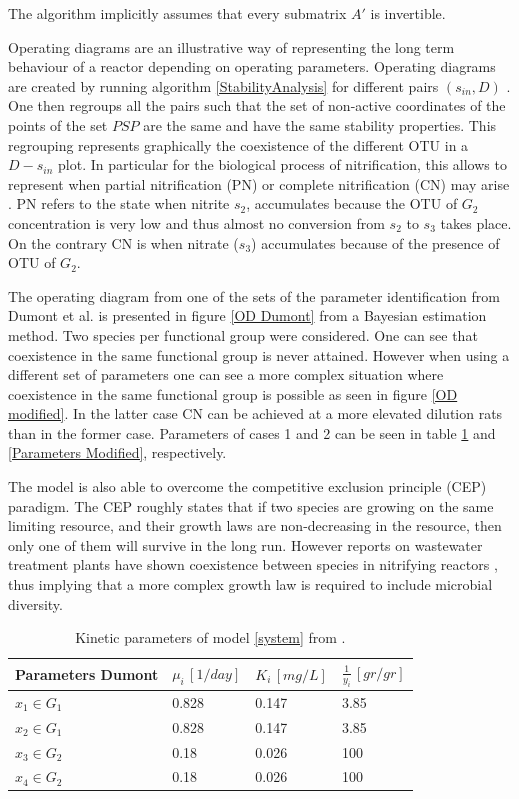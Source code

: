 \documentclass[3p,times]{elsarticle}
\begin{document}
The algorithm implicitly assumes that every submatrix $A'$ is invertible.

Operating diagrams are an illustrative way of representing the long term behaviour of a reactor depending on operating parameters. Operating diagrams are created by running algorithm \eqref{StabilityAnalysis} for different pairs $(s_{in},D)$ \cite{lobry2017chemostat}. One then regroups all the pairs such that the set of non-active coordinates of the points of the set $PSP$ are the same and have the same stability properties. This regrouping represents graphically the coexistence of the different OTU in a $D-s_{in}$ plot. In particular for the biological process of nitrification, this allows to represent when partial nitrification (PN) or complete nitrification (CN) may arise \cite{KHIN2004519}. PN refers to the state when nitrite $s_2$, accumulates because the OTU of $G_2$ concentration is very low and thus almost no conversion from $s_2$  to $s_3$ takes place. On the contrary CN is when nitrate ($s_3$) accumulates because of the presence of OTU of $G_2$.

The operating diagram from one of the sets of the parameter identification from Dumont et al. is presented in figure \ref{OD Dumont} from a Bayesian estimation method. Two species per functional group were considered. One can see that coexistence in the same functional group is never attained. However when using a different set of parameters one can see a more complex situation where coexistence in the same functional group is possible as seen in figure \ref{OD modified}. In the latter case CN can be achieved at a more elevated dilution rats than in the former case. Parameters of cases 1 and 2 can be seen in table \ref{Parameters Dumont} and \ref{Parameters Modified}, respectively. 

The model is also  able to overcome the  competitive exclusion principle \cite{lobry2017chemostat} (CEP) paradigm. The CEP roughly states that if two species are growing on the same limiting resource, and their growth laws are non-decreasing in the resource, then only one of them will survive in the long run. However reports on wastewater treatment plants have shown coexistence between species in nitrifying reactors \cite{Wagner2002}, thus implying that a more complex growth law is required to include microbial diversity.


\begin{table}[ht]
	\centering
	\begin{tabular}{|l|l|l|l|}
		\hline
		Parameters Dumont & $\mu_i\,[1/day]$ & $K_i\,[mg/L]$ & $\frac{1}{y_i} \, [gr/gr]$ \\ \hline
		$x_1 \in G_1$ & 0.828  & 0.147 & 3.85  \\ \hline
		$x_2\in G_1$ &0.828   & 0.147 &  3.85\\ \hline
		$x_3\in G_2$ & 0.18 & 0.026 &  100 \\ \hline
		$x_4\in G_2$ & 0.18 & 0.026 &  100 \\ \hline
	\end{tabular}
	\caption{Kinetic parameters of model \eqref{system} from \cite{Dumont2016}.}
	\label{Parameters Dumont}
\end{table}
\end{document}
